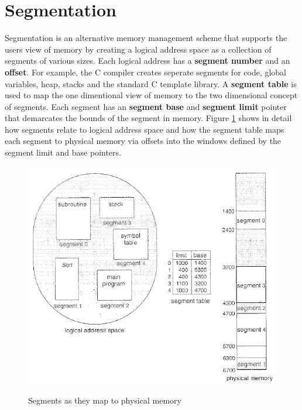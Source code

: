 \documentclass[10pt,a4paper]{article}
\begin{document}
\section{Segmentation}
Segmentation is an alternative memory management scheme that supports the users view of memory by creating a logical address space as a collection of segments of various sizes. Each logical address has a {\bf segment number} and an {\bf offset}. For example, the C compiler creates seperate segments for code, global variables, heap, stacks and the standard C template library. A {\bf segment table} is used to map the one dimentional view of memory to the two dimensional concept of segments. Each segment has an {\bf segment base} and {\bf segment limit} pointer that demarcates the bounds of the segment in memory. Figure \ref{seg} shows in detail how segments relate to logical address space and how the segment table maps each segment to physical memory via offsets into the windows defined by the segment limit and base pointers.
\begin{figure}
\caption{Segments as they map to physical memory \cite{OSCONCEPTS}}
\begin{center}
\includegraphics[scale=0.5]{../images/segmentation.png}
\label{seg}
\end{center}
\end{figure}
\end{document}
